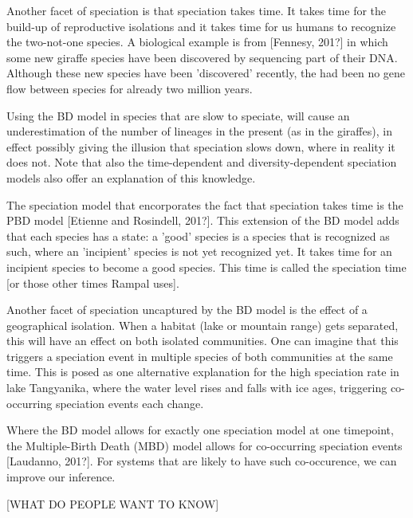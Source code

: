 Another facet of speciation is that speciation takes time. It
takes time for the build-up of reproductive isolations and it
takes time for us humans to recognize the two-not-one species.
A biological example is from [Fennesy, 201?] in which
some new giraffe species have been discovered by sequencing
part of their DNA. Although these new species have been
'discovered' recently, the had been no gene flow between species
for already two million years.

%
%
%

Using the BD model in species that are slow to speciate, will cause
an underestimation of the number of lineages in the present (as in the
giraffes), in effect possibly giving the illusion that speciation 
slows down, where in reality it does not. Note that also the
time-dependent and diversity-dependent speciation models also
offer an explanation of this knowledge.

%
%
%
%
%

The speciation model that encorporates the fact that speciation takes
time is the PBD model [Etienne and Rosindell, 201?]. This extension of the
BD model adds that each species has a state: a 'good' species is
a species that is recognized as such, where an 'incipient' species is
not yet recognized yet. It takes time for an incipient species to
become a good species. This time is called the speciation time [or those
other times Rampal uses].

%
%
%

Another facet of speciation uncaptured by the BD model is the
effect of a geographical isolation. When a habitat (lake or mountain range)
gets separated, this will have an effect on both isolated communities.
One can imagine that this triggers a speciation event in multiple species
of both communities at the same time. This is posed as one alternative
explanation for the high speciation rate in lake Tangyanika, where the water 
level rises and falls with ice ages, triggering co-occurring speciation
events each change. 

%
%
%

Where the BD model allows for exactly one speciation model at one timepoint,
the Multiple-Birth Death (MBD) model allows for co-occurring 
speciation events [Laudanno, 201?]. For systems that are likely
to have such co-occurence, we can improve our inference.







[WHAT DO PEOPLE WANT TO KNOW]

